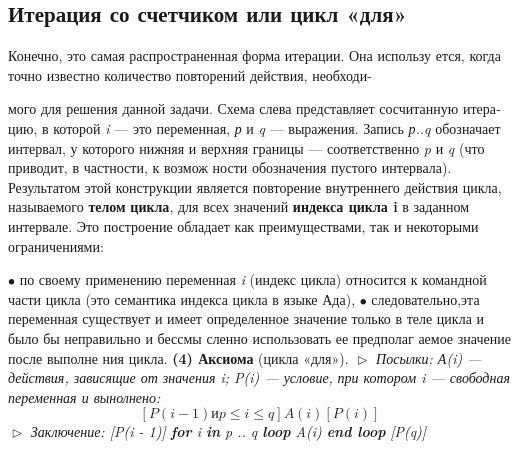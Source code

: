 \subsection{Итерация со счетчиком или цикл «для»}
\noindent Конечно,  это  самая  распространенная  форма  итерации.  Она использу­
ется, когда точно известно количество повторений действия, необходи-
\pagebreak

									\noindent мого для решения данной задачи. Схема 
									слева представляет сосчитанную итера­
									цию, в которой \textit{i} — это переменная, \textit{р} и 
									\textit{q} — выражения. Запись \textit{р..q} обозначает 
									интервал, у которого нижняя и  верхняя
границы — соответственно \textit{p} и \textit{q} (что приводит, в частности, к возмож­
ности обозначения пустого интервала). Результатом этой конструкции 
является повторение внутреннего действия цикла, называемого \textbf{телом}
\textbf{цикла}, для всех значений \textbf{индекса цикла i} в заданном интервале. Это 
построение обладает как преимуществами, так и некоторыми ограни­чениями:

\noindent $\bullet$ по своему применению переменная \textit{i} (индекс  цикла)  относится к 
командной  части  цикла  (это  семантика  индекса  цикла  в  языке 
Ада),
\newline
$\bullet$ следовательно,эта переменная существует и имеет определенное 
значение только в теле цикла и было бы  неправильно и бессмы­
сленно использовать ее предполаг аемое значение после выполне­
ния цикла.
\newline
\textbf{(4) Аксиома} (цикла «для»).
\newline
$\vartriangleright$ \textit{Посылки: А(i) --- действия, зависящие от значения i; P(i) --- условие,}
\textit{при котором i --- свободная переменная и вынолнено:}
\begin{equation*}
\textit{$[P(i - 1) и p \leqslant i \leqslant q] A(i) [P(i)]$}
\end{equation*}
$\vartriangleright$ \textit{Заключение:  \textit{[P(i - 1)]} \textbf{for} \textit{i} \textbf{in} \textit{p .. q} \textbf{loop} \textit{A(i)} \textbf{end loop}} \textit{[P(q)]}

